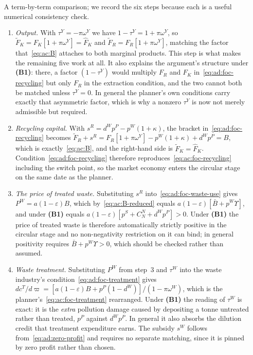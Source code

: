  A term-by-term comparison; we record the six steps because each is a useful numerical consistency check.
\begin{enumerate}[label=\arabic*.,leftmargin=2.4em]
\item \emph{Output.} With $\tau^Y=-\pi\omega^Y$ we have $1-\tau^Y=1+\pi\omega^Y$, so $\widetilde F_K=F_K\left[1+\pi\omega^Y\right]=\widehat F_K$ and $\widetilde F_R=F_R\left[1+\pi\omega^Y\right]$, matching the factor that~\eqref{eq:ac:B} attaches to both marginal products. This step is what makes the remaining five work at all. It also explains the argument's structure under \textbf{(B1)}: there, a factor $\left(1-\tau^Y\right)$ would multiply $F_R$ and $F_K$ in~\eqref{eq:ad:foc-recycling} but only $F_R$ in the extraction condition, and the two cannot both be matched unless $\tau^Y=0$. In general the planner's own conditions carry exactly that asymmetric factor, which is why a nonzero $\tau^Y$ is now not merely admissible but required.
\item \emph{Recycling capital.} With $s^R=d^Wp^P-p^W\left(1+\kappa\right)$, the bracket in~\eqref{eq:ad:foc-recycling} becomes $\widetilde F_R+s^R=F_R\left[1+\pi\omega^Y\right]-p^W\left(1+\kappa\right)+d^Wp^P=B$, which is exactly~\eqref{eq:ac:B}, and the right-hand side is $\widetilde F_K=\widehat F_K$. Condition~\eqref{eq:ad:foc-recycling} therefore reproduces~\eqref{eq:ac:foc-recycling} including the switch point, so the market economy enters the circular stage on the same date as the planner.
\item \emph{The price of treated waste.} Substituting $s^R$ into~\eqref{eq:ad:foc-waste-use} gives $P^W=a(1-\varepsilon)B$, which by~\eqref{eq:ac:B-reduced} equals $a(1-\varepsilon)\left[\bar B+p^W\Upsilon\right]$, and under \textbf{(B1)} equals $a(1-\varepsilon)\left[p^S+C^N_N+d^Wp^P\right]>0$. Under \textbf{(B1)} the price of treated waste is therefore automatically strictly positive in the circular stage and no non-negativity restriction on it can bind; in general positivity requires $\bar B+p^W\Upsilon>0$, which should be checked rather than assumed.
\item \emph{Waste treatment.} Substituting $P^W$ from step~3 and $\tau^W$ into the waste industry's condition~\eqref{eq:ad:foc-treatment} gives $dc^T/d\varpi=\left[a(1-\varepsilon)B+p^P(1-d^W)\right]/\left(1-\pi\omega^W\right)$, which is the planner's~\eqref{eq:ac:foc-treatment} rearranged. Under \textbf{(B1)} the reading of $\tau^W$ is exact: it is the \emph{extra} pollution damage caused by depositing a tonne untreated rather than treated, $p^P$ against $d^Wp^P$. In general it also absorbs the dilution credit that treatment expenditure earns. The subsidy $s^W$ follows from~\eqref{eq:ad:zero-profit} and requires no separate matching, since it is pinned by zero profit rather than chosen.

\end{enumerate}
